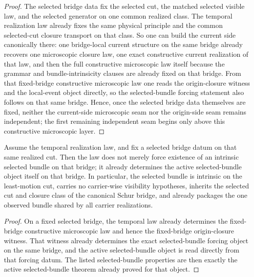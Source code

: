 \begin{proof}
The selected bridge data fix the selected cut, the matched selected visible
law, and the selected generator on one common realized class. The temporal
realization law already fixes the same physical principle and the common
selected-cut closure transport on that class. So one can build the current
side canonically there: one bridge-local current structure on the same
bridge already recovers one microscopic closure law, one exact constructive
current realization of that law, and then the full constructive microscopic
law itself because the grammar and bundle-intrinsicity clauses are already
fixed on that bridge. From that fixed-bridge constructive microscopic law one reads the
origin-closure witness and the local-event object directly, so the
selected-bundle forcing statement also follows on that same bridge. Hence,
once the selected bridge data themselves are fixed, neither the current-side
microscopic seam nor the origin-side seam remains independent; the first
remaining independent seam begins only above this constructive microscopic
layer.
\end{proof}

\begin{theorem}
\label{thm:temporal-law-determines-the-selected-bundle-itself-on-a-fixed-bridge}
Assume the temporal realization law, and fix a selected bridge datum on that
same realized cut. Then the law does not merely force existence of an
intrinsic selected bundle on that bridge; it already determines the active
selected-bundle object itself on that bridge. In particular, the selected
bundle is intrinsic on the least-motion cut, carries no carrier-wise
visibility hypotheses, inherits the selected cut and closure class of the
canonical Schur bridge, and already packages the one observed bundle shared by
all carrier realizations.
\end{theorem}

\begin{proof}
On a fixed selected bridge, the temporal law already determines the
fixed-bridge constructive microscopic law and hence the fixed-bridge
origin-closure witness. That witness already determines the exact
selected-bundle forcing object on the same bridge, and the active
selected-bundle object is read directly from that forcing datum. The listed
selected-bundle properties are then exactly the active selected-bundle theorem
already proved for that object.
\end{proof}

